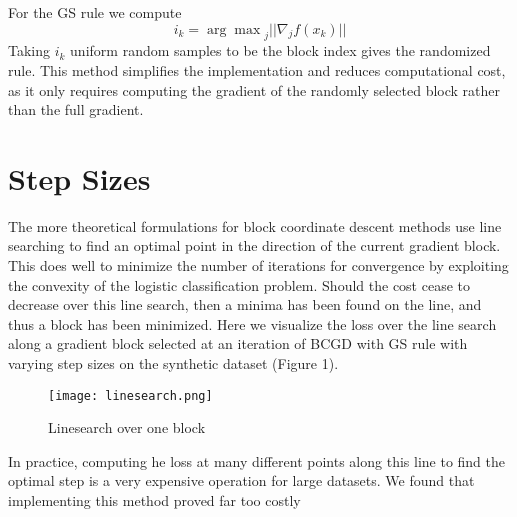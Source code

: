 \documentclass{article}
\begin{document}
For the GS rule we compute 
$$i_k = {\arg\max}_j ||\nabla_j f(x_k)||$$
Taking $i_k$ uniform random samples to be the block index gives the randomized rule. This method simplifies the implementation and reduces computational cost, as it only requires computing the gradient of the randomly selected block rather than the full gradient.

\section{Step Sizes}
The more theoretical formulations for block coordinate descent methods use line searching to find an optimal point in the direction of the current gradient block. This does well to minimize the number of iterations for convergence by exploiting the convexity of the logistic classification problem. Should the cost cease to decrease over this line search, then a minima has been found on the line, and thus a block has been minimized. Here we visualize the loss over the line search along a gradient block selected at an iteration of BCGD with GS rule with varying step sizes on the synthetic dataset (Figure 1).  
\begin{figure}
    \centering
    \texttt{[image: linesearch.png]}
    \caption{Linesearch over one block}
    \label{fig:linesearch}
\end{figure}
In practice, computing he loss at many different points along this line to find the optimal step is a very expensive operation for large datasets. We found that implementing this method proved far too costly
\end{document}
